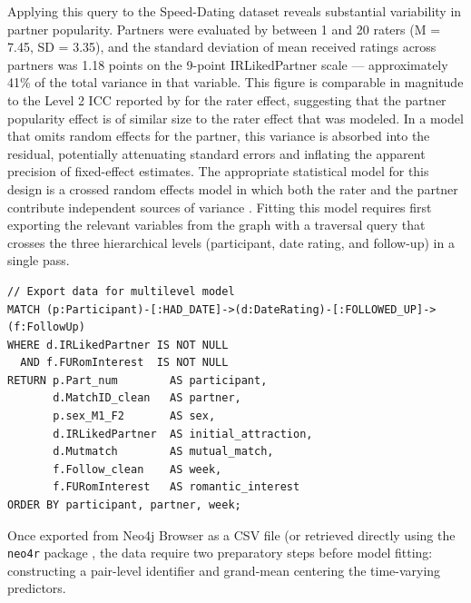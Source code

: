 \documentclass[sn-apa,pdflatex]{sn-jnl}
\theoremstyle{remark}
\theoremstyle{definition}
\begin{document}
Applying this query to the Speed-Dating dataset reveals substantial
variability in partner popularity. Partners were evaluated by between 1
and 20 raters (M = 7.45, SD = 3.35), and the standard deviation of mean
received ratings across partners was 1.18 points on the 9-point
IRLikedPartner scale --- approximately 41\% of the total variance in
that variable. This figure is comparable in magnitude to the Level 2 ICC
reported by \citep{Selterman2015} for the rater effect, suggesting that
the partner popularity effect is of similar size to the rater effect
that was modeled. In a model that omits random effects for the partner,
this variance is absorbed into the residual, potentially attenuating
standard errors and inflating the apparent precision of fixed-effect
estimates. The appropriate statistical model for this design is a
crossed random effects model in which both the rater and the partner
contribute independent sources of variance \citep{Kenny2006}. Fitting
this model requires first exporting the relevant variables from the
graph with a traversal query that crosses the three hierarchical levels
(participant, date rating, and follow-up) in a single pass.

\begin{verbatim}
// Export data for multilevel model
MATCH (p:Participant)-[:HAD_DATE]->(d:DateRating)-[:FOLLOWED_UP]->(f:FollowUp)
WHERE d.IRLikedPartner IS NOT NULL
  AND f.FURomInterest  IS NOT NULL
RETURN p.Part_num        AS participant,
       d.MatchID_clean   AS partner,
       p.sex_M1_F2       AS sex,
       d.IRLikedPartner  AS initial_attraction,
       d.Mutmatch        AS mutual_match,
       f.Follow_clean    AS week,
       f.FURomInterest   AS romantic_interest
ORDER BY participant, partner, week;
\end{verbatim}

Once exported from Neo4j Browser as a CSV file (or retrieved directly
using the \texttt{neo4r} package \citep{Fay2019}, the data require two
preparatory steps before model fitting: constructing a pair-level
identifier and grand-mean centering the time-varying predictors.
\end{document}
